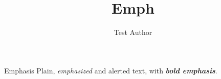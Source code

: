 \documentclass[aspectratio=169,10pt]{beamer}
\title{Emph}
\author{Test Author}
\begin{document}
\begin{frame}{Emphasis}
	Plain, \emph{emphasized} and \alert{alerted} text, with \textbf{\emph{bold emphasis}}.
\end{frame}
\end{document}
